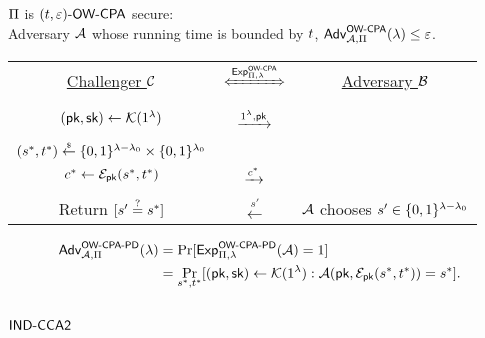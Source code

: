 \documentclass{article}
\begin{document}
$\Pi$ is $(t, \varepsilon)\textsf{-}\textsf{OW-CPA}$ secure: \\
Adversary $\mathcal{A}$ whose running time is bounded by $t$,
$\textsf{Adv}^{\textsf{OW-CPA}}_{\mathcal{A}, \Pi}(\lambda) \le \varepsilon$.

\begin{tcolorbox}[colback=white]
	\centering
	\begin{tabularx}{\linewidth}{CcC}
		\underline{Challenger $\mathcal{C}$} & 
		$\xLeftrightarrow{\Exp^{\owcpa}_{\sch, \sp}}$ & 
		\underline{Adversary $\mathcal{B}$} \\

		 \\

		$(\textsf{pk}, \textsf{sk}) \gets \mathcal{K}(1^{\lambda})$ & 
		$\xrightarrow{1^{\lambda}, \textsf{pk}}$ & 
	   \\

		 \\

		$(s^*, t^*) \overset{{\scriptscriptstyle\$}}{\leftarrow} \{0, 1\}^{\lambda - \lambda_0} \times \{0, 1\}^{\lambda_0}$ \\
		$c^* \gets \mathcal{E}_{\textsf{pk}}(s^*, t^*)$ &
		$\xrightarrow{c^*}$ &
		 \\

		 \\

		Return $[s' \overset{?}{=} s^*]$ & 
		$\xleftarrow{s'}$ & 
		$\mathcal{A}$ chooses $s' \in \{0, 1\}^{\lambda - \lambda_0}$ \\
  \end{tabularx}
\end{tcolorbox}

\begin{align}
	\begin{split}
		\textsf{Adv}^{\textsf{OW-CPA-PD}}_{\mathcal{A}, \Pi}(\lambda)
		&= \Pr[\textsf{Exp}^{\textsf{OW-CPA-PD}}_{\Pi, \lambda}(\mathcal{A}) = 1] \\
		&= \underset{s^*, t^*}{\Pr}[
				(\textsf{pk}, \textsf{sk}) \gets \mathcal{K}(1^{\lambda}): 
				\mathcal{A}(\textsf{pk}, \mathcal{E}_{\textsf{pk}}(s^*, t^*)) = s^*].
	\end{split}
\end{align}


\subsection{$\textsf{IND-CCA2}$}
\end{document}
